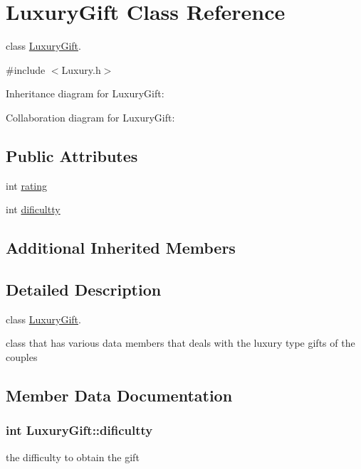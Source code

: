 \hypertarget{classLuxuryGift}{}\section{Luxury\+Gift Class Reference}
\label{classLuxuryGift}


class \hyperlink{classLuxuryGift}{Luxury\+Gift}.  




{\ttfamily \#include $<$Luxury.\+h$>$}



Inheritance diagram for Luxury\+Gift\+:


Collaboration diagram for Luxury\+Gift\+:
\subsection*{Public Attributes}
\begin{DoxyCompactItemize}
\item 
int \hyperlink{classLuxuryGift_a1b7437bf65f5862686fb61a3da0d0b75}{rating}
\item 
int \hyperlink{classLuxuryGift_af93bb198928b5fcfa14c3fa8c00fc554}{dificultty}
\end{DoxyCompactItemize}
\subsection*{Additional Inherited Members}


\subsection{Detailed Description}
class \hyperlink{classLuxuryGift}{Luxury\+Gift}. 

class that has various data members that deals with the luxury type gifts of the couples 

\subsection{Member Data Documentation}
\subsubsection[{\texorpdfstring{dificultty}{dificultty}}]{\setlength{\rightskip}{0pt plus 5cm}int Luxury\+Gift\+::dificultty}\hypertarget{classLuxuryGift_af93bb198928b5fcfa14c3fa8c00fc554}{}\label{classLuxuryGift_af93bb198928b5fcfa14c3fa8c00fc554}
the difficulty to obtain the gift 
